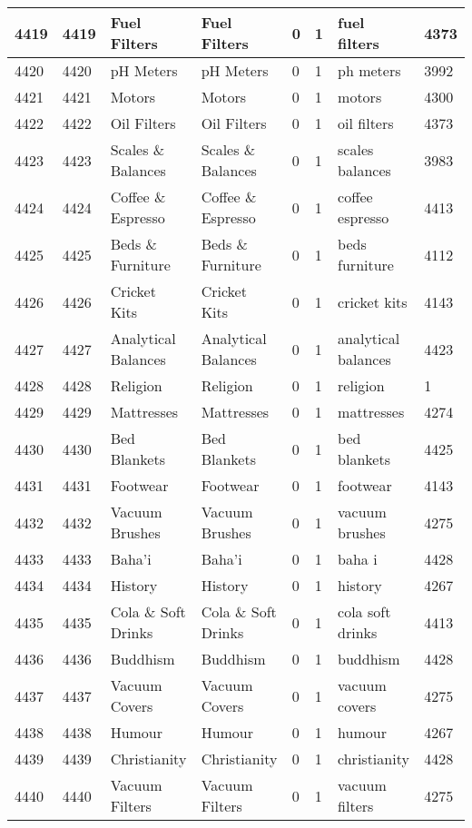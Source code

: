\begin{longtable}{|l|l|l|l|l|l|l|l|}
4419 & 4419 & Fuel Filters & Fuel Filters & 0 & 1 & fuel filters & 4373 \\ \hline 
4420 & 4420 & pH Meters & pH Meters & 0 & 1 & ph meters & 3992 \\ \hline 
4421 & 4421 & Motors & Motors & 0 & 1 & motors & 4300 \\ \hline 
4422 & 4422 & Oil Filters & Oil Filters & 0 & 1 & oil filters & 4373 \\ \hline 
4423 & 4423 & Scales \& Balances & Scales \& Balances & 0 & 1 & scales balances & 3983 \\ \hline 
4424 & 4424 & Coffee \& Espresso & Coffee \& Espresso & 0 & 1 & coffee espresso & 4413 \\ \hline 
4425 & 4425 & Beds \& Furniture & Beds \& Furniture & 0 & 1 & beds furniture & 4112 \\ \hline 
4426 & 4426 & Cricket Kits & Cricket Kits & 0 & 1 & cricket kits & 4143 \\ \hline 
4427 & 4427 & Analytical Balances & Analytical Balances & 0 & 1 & analytical balances & 4423 \\ \hline 
4428 & 4428 & Religion & Religion & 0 & 1 & religion & 1 \\ \hline 
4429 & 4429 & Mattresses & Mattresses & 0 & 1 & mattresses & 4274 \\ \hline 
4430 & 4430 & Bed Blankets & Bed Blankets & 0 & 1 & bed blankets & 4425 \\ \hline 
4431 & 4431 & Footwear & Footwear & 0 & 1 & footwear & 4143 \\ \hline 
4432 & 4432 & Vacuum Brushes & Vacuum Brushes & 0 & 1 & vacuum brushes & 4275 \\ \hline 
4433 & 4433 & Baha'i & Baha'i & 0 & 1 & baha i & 4428 \\ \hline 
4434 & 4434 & History & History & 0 & 1 & history & 4267 \\ \hline 
4435 & 4435 & Cola \& Soft Drinks & Cola \& Soft Drinks & 0 & 1 & cola soft drinks & 4413 \\ \hline 
4436 & 4436 & Buddhism & Buddhism & 0 & 1 & buddhism & 4428 \\ \hline 
4437 & 4437 & Vacuum Covers & Vacuum Covers & 0 & 1 & vacuum covers & 4275 \\ \hline 
4438 & 4438 & Humour & Humour & 0 & 1 & humour & 4267 \\ \hline 
4439 & 4439 & Christianity & Christianity & 0 & 1 & christianity & 4428 \\ \hline 
4440 & 4440 & Vacuum Filters & Vacuum Filters & 0 & 1 & vacuum filters & 4275 \\ \hline 

\end{longtable}

